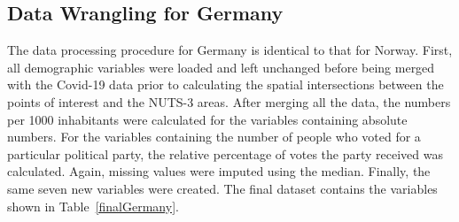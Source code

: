 \subsection{Data Wrangling for Germany}
The data processing procedure for Germany is identical to that for Norway. First, all demographic variables were loaded and left unchanged before being merged with the Covid-19 data prior to calculating the spatial intersections between the points of interest and the NUTS-3 areas. After merging all the data, the numbers per 1000 inhabitants were calculated for the variables containing absolute numbers. For the variables containing the number of people who voted for a particular political party, the relative percentage of votes the party received was calculated. Again, missing values were imputed using the median.
Finally, the same seven new variables were created. 
The final dataset contains the variables shown in Table~\ref{finalGermany}.
